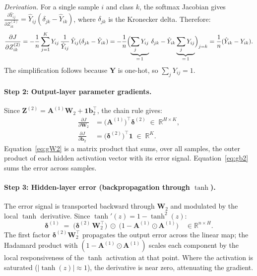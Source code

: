 \documentclass[11pt]{article}
\newcommand{\R}{\mathbb{R}}
\newcommand{\bW}{\mathbf{W}}
\newcommand{\bb}{\mathbf{b}}
\newcommand{\bY}{\mathbf{Y}}
\newcommand{\bZ}{\mathbf{Z}}
\newcommand{\bA}{\mathbf{A}}
\newcommand{\bone}{\mathbf{1}}
\newcommand{\bdelta}{\boldsymbol{\delta}}
\begin{document}
\textit{Derivation.}  For a single sample $i$ and class $k$, the softmax Jacobian gives
$\frac{\partial \hat{Y}_{ij}}{\partial Z^{(2)}_{ik}} = \hat{Y}_{ij}(\delta_{jk} - \hat{Y}_{ik})$,
where $\delta_{jk}$ is the Kronecker delta.  Therefore:
\[
  \frac{\partial J}{\partial Z^{(2)}_{ik}}
  = -\frac{1}{n}\sum_{j=1}^{K} Y_{ij}\,
    \frac{1}{\hat{Y}_{ij}}\,\hat{Y}_{ij}(\delta_{jk} - \hat{Y}_{ik})
  = -\frac{1}{n}\Bigl(\underbrace{\sum_j Y_{ij}}_{=\,1}\,\delta_{jk}
    - \hat{Y}_{ik}\underbrace{\sum_j Y_{ij}}_{=\,1}\Bigr)_{j=k}
  = \frac{1}{n}(\hat{Y}_{ik} - Y_{ik}).
\]
The simplification follows because $\bY$ is one-hot, so $\sum_j Y_{ij} = 1$.

\paragraph{Step 2: Output-layer parameter gradients.}
Since $\bZ^{(2)} = \bA^{(1)}\bW_2 + \bone\bb_2^\top$, the chain rule gives:
\begin{align}
  \frac{\partial J}{\partial \bW_2}
  &= \bigl(\bA^{(1)}\bigr)^\top \bdelta^{(2)}
  \;\in\;\R^{H\times K},
  \label{eq:gW2}\\[4pt]
  \frac{\partial J}{\partial \bb_2}
  &= \bigl(\bdelta^{(2)}\bigr)^\top\bone
  \;\in\;\R^{K}.
  \label{eq:gb2}
\end{align}
Equation~\eqref{eq:gW2} is a matrix product that sums, over all samples, the outer product
of each hidden activation vector with its error signal.  Equation~\eqref{eq:gb2} sums the
error across samples.

\paragraph{Step 3: Hidden-layer error (backpropagation through $\tanh$).}
The error signal is transported backward through $\bW_2$ and modulated by the local
$\tanh$ derivative.  Since $\tanh'(z) = 1 - \tanh^2(z)$:
\begin{equation}\label{eq:delta1}
  \bdelta^{(1)}
  \;=\;
  \bigl(\bdelta^{(2)}\,\bW_2^\top\bigr)
  \;\odot\;
  \bigl(1 - \bA^{(1)}\odot\bA^{(1)}\bigr)
  \quad\in\R^{n\times H}.
\end{equation}
The first factor $\bdelta^{(2)}\bW_2^\top$ propagates the output error across the linear map;
the Hadamard product with $(1 - \bA^{(1)}\odot\bA^{(1)})$ scales each component by the
local responsiveness of the $\tanh$ activation at that point.  Where the activation is
saturated ($|\tanh(z)|\approx 1$), the derivative is near zero, attenuating the gradient.
\end{document}

